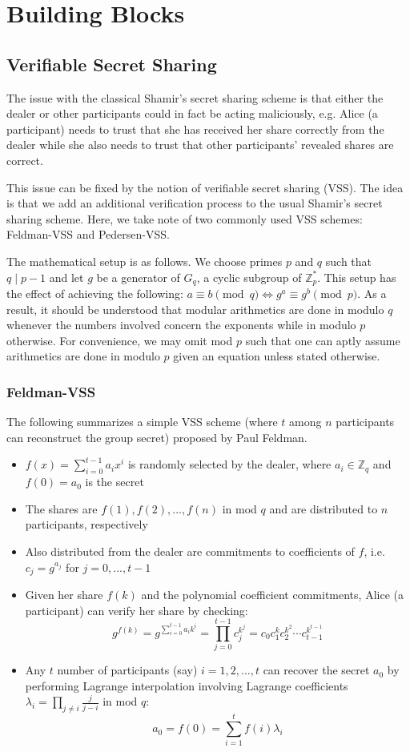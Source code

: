 \documentclass[11pt]{article}
\theoremstyle{definition}
\theoremstyle{remark}
\begin{document}
\section{Building Blocks}
\subsection{Verifiable Secret Sharing}
The issue with the classical Shamir's secret sharing scheme is that either the dealer or other participants could in fact be acting maliciously, e.g. Alice (a participant) needs to trust that she has received her share correctly from the dealer while she also needs to trust that other participants' revealed shares are correct.

This issue can be fixed by the notion of verifiable secret sharing (VSS). The idea is that we add an additional verification process to the usual Shamir's secret sharing scheme. Here, we take note of two commonly used VSS schemes: Feldman-VSS and Pedersen-VSS.

The mathematical setup is as follows. We choose primes $p$ and $q$ such that $q \mid p - 1$ and let $g$ be a generator of $G_q$, a cyclic subgroup of $\mathbb{Z}^*_p$. This setup has the effect of achieving the following: $a \equiv b \pmod q \iff g^a \equiv g^b \pmod p$. As a result, it should be understood that modular arithmetics are done in modulo $q$ whenever the numbers involved concern the exponents while in modulo $p$ otherwise. For convenience, we may omit mod $p$ such that one can aptly assume arithmetics are done in modulo $p$ given an equation unless stated otherwise.

\subsubsection{Feldman-VSS}
The following summarizes a simple VSS scheme (where $t$ among $n$ participants can reconstruct the group secret) proposed by Paul Feldman.

\begin{itemize}
\item $f(x) = \sum_{i = 0}^{t - 1} a_i x^i$ is randomly selected by the dealer, where $a_i \in \mathbb{Z}_q$ and $f(0) = a_0$ is the secret
\item The shares are $f(1), f(2), ..., f(n)$ in mod $q$ and are distributed to $n$ participants, respectively
\item Also distributed from the dealer are commitments to coefficients of $f$, i.e. $c_j = g^{a_j}$ for $j = 0, ..., t - 1$
\item Given her share $f(k)$ and the polynomial coefficient commitments, Alice (a participant) can verify her share by checking:
$$g^{f(k)} = g^{\sum_{i = 0}^{t - 1} a_i k^i} = \prod_{j = 0}^{t - 1} c_j^{k^j} = c_0 c_1^k c_2^{k^2} \cdots c_{t - 1}^{k^{t - 1}}$$
\item Any $t$ number of participants (say) $i = 1, 2, ..., t$ can recover the secret $a_0$ by performing Lagrange interpolation involving Lagrange coefficients $\lambda_i = \prod_{j \neq i} \frac{j}{j - i}$ in mod $q$:
$$a_0 = f(0) = \sum_{i = 1}^{t} f(i) \lambda_i$$
\end{itemize}
\end{document}
